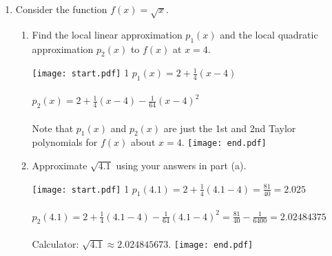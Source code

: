 \documentclass[12pt]{article}
\begin{document}
\begin{enumerate}

\item Consider the function $f(x)=\sqrt{x}$.

\begin{enumerate}

\item Find the local linear approximation $p_1(x)$ and the local quadratic approximation $p_2(x)$ to $f(x)$ at $x=4$.

\texttt{[image: start.pdf]}
{{{1\linewidth}{
$p_1(x)=2+\frac{1}{4}(x-4)$ \\ \\
$p_2(x)=2+\frac{1}{4}(x-4)-\frac{1}{64}(x-4)^2$ \\ \\
Note that $p_1(x)$ and $p_2(x)$ are just the 1st and 2nd Taylor polynomials for $f(x)$ about $x=4$. }}}
\texttt{[image: end.pdf]}


\item Approximate $\sqrt{4.1}$ using your answers in part (a).

\texttt{[image: start.pdf]}
{{{1\linewidth}{
$p_1(4.1)=2+\frac{1}{4}(4.1-4)=\frac{81}{40}=2.025$ \\ \\
$p_2(4.1)=2+\frac{1}{4}(4.1-4)-\frac{1}{64}(4.1-4)^2=\frac{81}{40}-\frac{1}{6400}=2.02484375$ \\ \\
Calculator: $\sqrt{4.1} \approx 2.024845673$.  }}}
\texttt{[image: end.pdf]}


\end{enumerate}

\end{enumerate}
\end{document}
